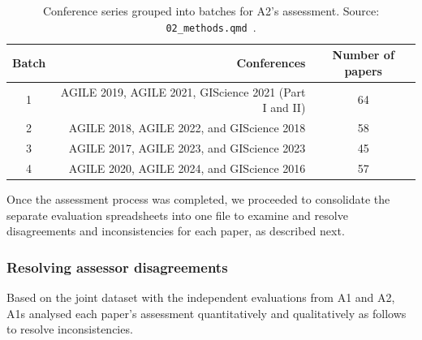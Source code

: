 \documentclass{josis}
\begin{document}
\begin{table}
\centering
\begin{tabular}{crc}
\hline
Batch & Conferences & Number of papers\\
\hline
1 & AGILE 2019, AGILE 2021, GIScience 2021 (Part I and II) &  64 \\
2 & AGILE 2018, AGILE 2022, and GIScience 2018 &  58 \\ 
3 & AGILE 2017, AGILE 2023, and GIScience 2023 &  45 \\ 
4 & AGILE 2020, AGILE 2024, and GIScience 2016 &  57 \\ 
\hline
\end{tabular}
\caption{Conference series grouped into batches for A2's assessment. Source: \texttt{02\_methods.qmd}~\cite{data}.}
\label{tab:batches}
\end{table}

Once the assessment process was completed, we proceeded to consolidate the separate evaluation spreadsheets into one file to examine and resolve disagreements and inconsistencies for each paper, as described next. 

\subsubsection{Resolving assessor disagreements}
\label{sec:methods:assessment:disagreement}


Based on the joint dataset with the independent evaluations from A1 and A2, A1s analysed each paper's assessment quantitatively and qualitatively as follows to resolve inconsistencies. 
\end{document}
